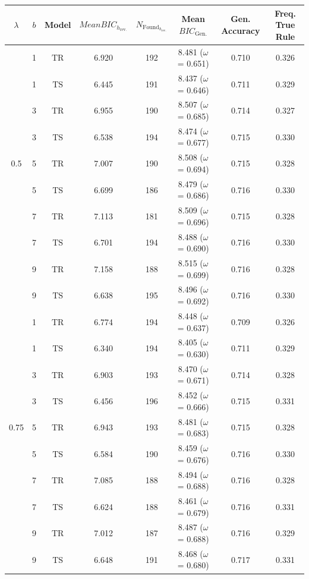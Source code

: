 \documentclass[doc,natbib,floatsintext]{apa7}
\newcommand{\hr}{h_{\mathrm{rev.}}}
\begin{document}
\begin{appendices}
\begin{table}[!ht]
\begin{center}
{\begin{tabular}{c c c c c c c c}
$\lambda$ & $b$ & Model & $Mean BIC_{\hr}$ &  $N_{{\text{Found}}_{\hr}}$  & Mean $BIC_{\text{Gen.}}$ & Gen. Accuracy & Freq. True Rule \\ 

\toprule
& 1 & $\text{TR}$ & 6.920 & 192 & 8.481 ($\omega$ = 0.651) & 0.710 & 0.326\\
& 1 & $\text{TS}$ & 6.445 & 191 & 8.437 ($\omega$ = 0.646) & 0.711 & 0.329\\
& 3 & $\text{TR}$ & 6.955 & 190 & 8.507 ($\omega$ = 0.685) & 0.714 & 0.327\\
& 3 & $\text{TS}$ & 6.538 & 194 & 8.474 ($\omega$ = 0.677) & 0.715 & 0.330\\
0.5  & 5 & $\text{TR}$ & 7.007 & 190 & 8.508 ($\omega$ = 0.694) & 0.715 & 0.328\\
& 5 & $\text{TS}$ & 6.699 & 186 & 8.479 ($\omega$ = 0.686) & 0.716 & 0.330\\
& 7 & $\text{TR}$ & 7.113 & 181 & 8.509 ($\omega$ = 0.696) & 0.715 & 0.328\\
& 7 & $\text{TS}$ & 6.701 & 194 & 8.488 ($\omega$ = 0.690) & 0.716 & 0.330\\
& 9 & $\text{TR}$ & 7.158 & 188 & 8.515 ($\omega$ = 0.699) & 0.716 & 0.328\\
& 9 & $\text{TS}$ & 6.638 & 195 & 8.496 ($\omega$ = 0.692) & 0.716 & 0.330\\
\midrule

& 1 & $\text{TR}$ & 6.774 & 194 & 8.448 ($\omega$ = 0.637) & 0.709 & 0.326\\
& 1 & $\text{TS}$ & 6.340 & 194 & 8.405 ($\omega$ = 0.630) & 0.711 & 0.329\\
& 3 & $\text{TR}$ & 6.903 & 193 & 8.470 ($\omega$ = 0.671) & 0.714 & 0.328\\
& 3 & $\text{TS}$ & 6.456 & 196 & 8.452 ($\omega$ = 0.666) & 0.715 & 0.331\\
0.75 & 5 & $\text{TR}$ & 6.943 & 193 & 8.481 ($\omega$ = 0.683) & 0.715 & 0.328\\
& 5 & $\text{TS}$ & 6.584 & 190 & 8.459 ($\omega$ = 0.676) & 0.716 & 0.330\\
& 7 & $\text{TR}$ & 7.085 & 188 & 8.494 ($\omega$ = 0.688) & 0.716 & 0.328\\
& 7 & $\text{TS}$ & 6.624 & 188 & 8.461 ($\omega$ = 0.679) & 0.716 & 0.331\\
& 9 & $\text{TR}$ & 7.012 & 187 & 8.487 ($\omega$ = 0.688) & 0.716 & 0.329\\
& 9 & $\text{TS}$ & 6.648 & 191 & 8.468 ($\omega$ = 0.680) & 0.717 & 0.331\\


\end{tabular}}
\end{center}
\end{table}
\end{appendices}
\end{document}
